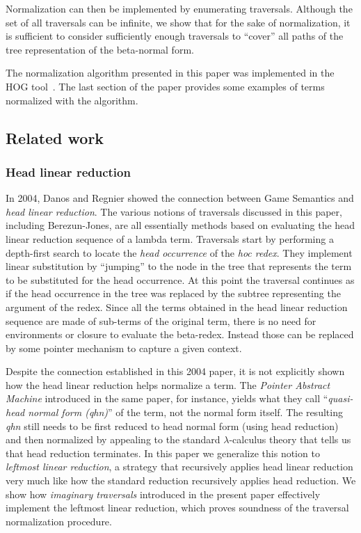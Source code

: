 \documentclass{article}
\theoremstyle{definition}
\begin{document}
Normalization can then be implemented by enumerating traversals. Although the set of all traversals can be infinite, we show that for the sake of normalization, it is sufficient to consider sufficiently enough traversals to ``cover'' all paths of the tree representation of the beta-normal form.

The normalization algorithm presented in this paper was implemented in the HOG tool~\cite{Blum-HogTool}. The last section of the paper provides some examples of terms normalized with the algorithm.

\subsection{Related work}

\subsubsection{Head linear reduction}
In 2004, Danos and Regnier showed the connection between Game Semantics and \emph{head linear reduction}. The various notions of traversals discussed in this paper, including Berezun-Jones, are all essentially methods based on evaluating the head linear reduction sequence of a lambda term. Traversals start by performing a depth-first search to locate the \emph{head occurrence} of the \emph{hoc redex}. They implement linear substitution by ``jumping'' to the node in the tree that represents the term to be substituted for the head occurrence. At this point the traversal continues as if the head occurrence in the tree was replaced by the subtree representing the argument of the redex. Since all the terms obtained in the head linear reduction sequence are made of sub-terms of the original term, there is no need for environments or closure to evaluate the beta-redex. Instead those can be replaced by some pointer mechanism to capture a given context.

Despite the connection established in this 2004 paper, it is not explicitly shown how the head linear reduction helps normalize a term. The \emph{Pointer Abstract Machine} introduced in the same paper, for instance, yields what they call ``\emph{quasi-head normal form (qhn)}'' of the term, not the normal form itself. The resulting \emph{qhn} still needs to be first reduced to head normal form (using head reduction) and then normalized by appealing to the standard $\lambda$-calculus theory that tells us that head reduction terminates.
In this paper we generalize this notion to \emph{leftmost linear reduction}, a strategy that recursively applies head linear reduction very much like how the standard reduction recursively applies head reduction. We show how \emph{imaginary traversals} introduced in the present paper effectively implement the leftmost linear reduction, which proves soundness of the traversal normalization procedure.
\end{document}
